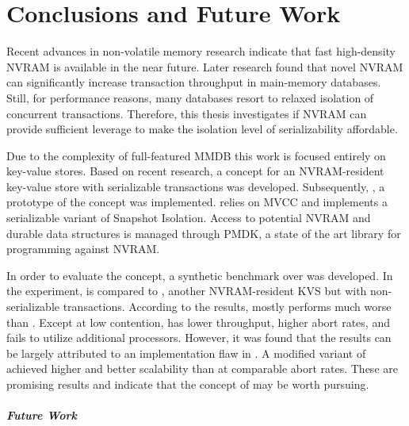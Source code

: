 \chapter{Conclusions and Future Work}
\label{ch:summary}

Recent advances in non-volatile memory research indicate that fast high-density
NVRAM is available in the near future. Later research found that novel NVRAM can
significantly increase transaction throughput in main-memory databases. Still,
for performance reasons, many databases resort to relaxed isolation of
concurrent transactions. Therefore, this thesis investigates if NVRAM can
provide sufficient leverage to make the isolation level of serializability
affordable.

Due to the complexity of full-featured MMDB this work is focused entirely on
key-value stores. Based on recent research, a concept for an NVRAM-resident
key-value store with serializable transactions was developed. Subsequently,
\midas, a prototype of the concept was implemented. \midas relies on MVCC and
implements a serializable variant of Snapshot Isolation. Access to potential
NVRAM and durable data structures is managed through PMDK, a state of the art
library for programming against NVRAM.

In order to evaluate the concept, a synthetic benchmark over \ttp was developed.
In the experiment, \midas is compared to \echo, another NVRAM-resident \ac{KVS}
but with non-serializable transactions. According to the results, \midas mostly
performs much worse than \echo. Except at low contention, \midas has lower
throughput, higher abort rates, and fails to utilize additional processors.
However, it was found that the results can be largely attributed to an
implementation flaw in \midas. A modified variant of \midas achieved higher
\tput and better scalability than \echo at comparable abort rates. These are
promising results and indicate that the concept of \midas may be worth pursuing.

\paragraph{Future Work}



